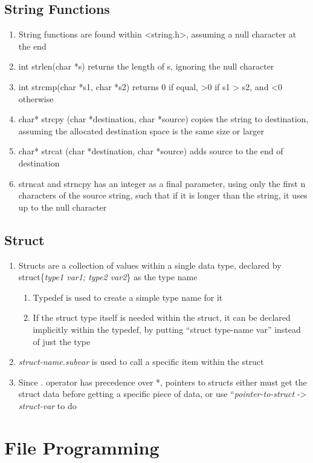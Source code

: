 \documentclass[11 pt, twoside]{article}
\begin{document}
\subsection{String Functions}
\begin{enumerate}
\item String functions are found within <string.h>, assuming a null character at the end
\item int strlen(char *s) returns the length of s, ignoring the null character
\item int strcmp(char *s1, char *s2) returns 0 if equal, >0 if s1 > s2, and <0 otherwise
\item char* strcpy (char *destination, char *source) copies the string to destination, assuming the allocated destination space is the same size or larger
\item char* strcat (char *destination, char *source) adds source to the end of destination
\item strncat and strncpy has an integer as a final parameter, using only the first n characters of the source string, such that if it is longer than the string, it uses up to the null character 
\end{enumerate}
\subsection{Struct}
\begin{enumerate}
\item Structs are a collection of values within a single data type, declared by struct\{\textit{type1 var1; type2 var2}\} as the type name
\begin{enumerate}
\item Typedef is used to create a simple type name for it
\item If the struct type itself is needed within the struct, it can be declared implicitly within the typedef, by putting ``struct type-name var'' instead of just the type
\end{enumerate}
\item \textit{struct-name.subvar} is used to call a specific item within the struct
\item Since . operator has precedence over *, pointers to structs either must get the struct data before getting a specific piece of data, or use ``\textit{pointer-to-struct} -> \textit{struct-var} to do 
\end{enumerate}

\section{File Programming}
\end{document}
